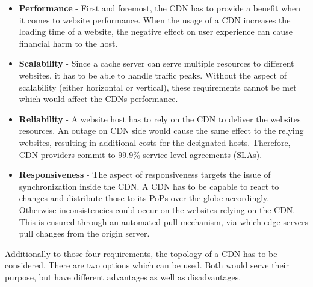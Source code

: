 \begin{itemize}
	\item \textbf{Performance} - First and foremost, the CDN has to provide a benefit when it comes to website performance. When the usage of a CDN increases the loading time of a website, the negative effect on user experience can cause financial harm to the host.\cite{cdn_general}
	\item \textbf{Scalability} - Since a cache server can serve multiple resources to different websites, it has to be able to handle traffic peaks. Without the aspect of scalability (either horizontal or vertical), these requirements cannot be met which would affect the CDNs performance.
	\item \textbf{Reliability} -  A website host has to rely on the CDN to deliver the websites resources. An outage on CDN side would cause the same effect to the relying websites, resulting in additional costs for the designated hosts. Therefore, CDN providers commit to 99.9\% service level agreements (SLAs).
	\item \textbf{Responsiveness} -  The aspect of responsiveness targets the issue of synchronization inside the CDN. A CDN has to be capable to react to changes and distribute those to its PoPs over the globe accordingly. Otherwise inconsistencies could occur on the websites relying on the CDN. This is ensured through an automated pull mechanism, via which edge servers pull changes from the origin server.\cite{cdn_origin_server}
\end{itemize}

Additionally to those four requirements, the topology of a CDN has to be considered. There are two options which can be used. Both would serve their purpose, but have different advantages as well as disadvantages. 

